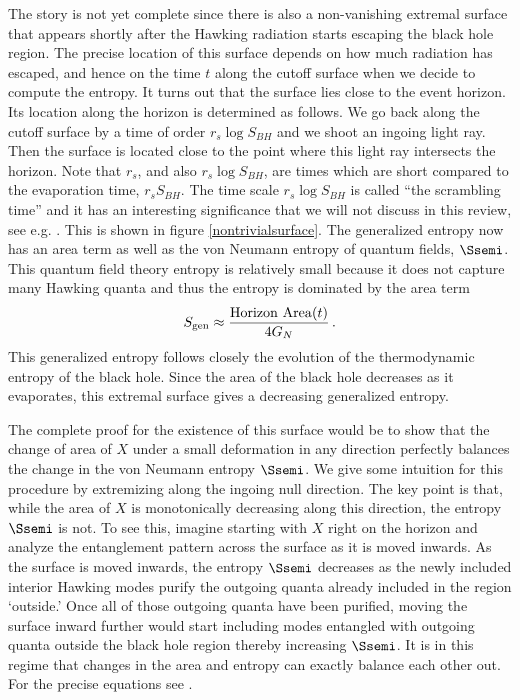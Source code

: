 The story is not yet complete since there is also a non-vanishing extremal surface that appears  shortly after the Hawking radiation starts escaping the black hole region. The precise location of this surface depends on how much radiation has escaped, and hence on the time $t$ along the cutoff surface when we decide to compute the entropy. 
It turns out that the surface lies close to the event horizon. 
Its location along the horizon is determined as follows. We go back along the cutoff surface by a time of order $r_s \log S_{BH}$ and we shoot an ingoing light ray. Then the surface is located close to the point where this light ray intersects the horizon. Note that $r_s$, and also $r_s \log S_{BH}$, are times which are short compared to the evaporation time, $r_s S_{BH}$. The time scale $r_s \log S_{BH}$ is called ``the scrambling time'' and it   has an interesting significance that we will not discuss in this review, see e.g. \cite{Hayden:2007cs,Sekino:2008he}. 
This is shown in figure \ref{nontrivialsurface}. The generalized entropy  now has an area term as well as the von Neumann entropy of quantum fields, $\Ssemi$. %
This quantum field theory entropy is relatively small because it does not capture many Hawking quanta and thus the  entropy is dominated by the area term
\begin{align}
S_\mathrm{gen} \approx {\mathrm{Horizon \ Area}(t)  \over 4 G_N} \,.
\end{align}
This generalized entropy follows closely the evolution of the thermodynamic entropy of the black hole. Since the area of the black hole decreases as it evaporates, this extremal surface gives a decreasing generalized entropy. 


The complete proof for the existence of this surface would be to show that the change of area of $X$ under a small deformation in any direction perfectly balances the change in the von Neumann entropy  $\Ssemi$. We give some intuition for this procedure by extremizing along the ingoing null direction. The key point is that, while the area of $X$ is monotonically decreasing along this direction,  the entropy  $\Ssemi$ is not. To see this, imagine starting with $X$ right on the horizon and analyze the entanglement pattern across the surface as it is moved inwards. As the surface is moved inwards, the entropy $\Ssemi$   decreases as the newly included interior Hawking modes  purify the outgoing quanta already included in the region `outside.' Once all of those outgoing quanta have been purified, moving the surface inward further would start including modes entangled with outgoing quanta outside the black hole region thereby increasing $\Ssemi$. It is in this regime that changes in the area and entropy can exactly balance each other out. For the precise equations see \cite{Almheiri:2019psf,Penington:2019npb}. 
 

